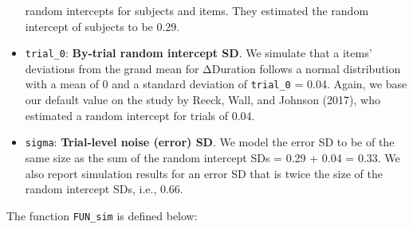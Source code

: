 \documentclass[
  letterpaper,
  DIV=11,
  numbers=noendperiod]{scrartcl}
\begin{document}
\begin{itemize}
  random intercepts for subjects and items. They estimated the random
  intercept of subjects to be 0.29.
\item
  \texttt{trial\_0}: \textbf{By-trial random intercept SD}. We simulate
  that a items' deviations from the grand mean for ΔDuration follows a
  normal distribution with a mean of 0 and a standard deviation of
  \texttt{trial\_0} = 0.04. Again, we base our default value on the
  study by Reeck, Wall, and Johnson (2017), who estimated a random
  intercept for trials of 0.04.
\item
  \texttt{sigma}: \textbf{Trial-level noise (error) SD}. We model the
  error SD to be of the same size as the sum of the random intercept SDs
  = 0.29 + 0.04 = 0.33. We also report simulation results for an error
  SD that is twice the size of the random intercept SDs, i.e., 0.66.
\end{itemize}

The function \texttt{FUN\_sim} is defined below:
\end{document}
